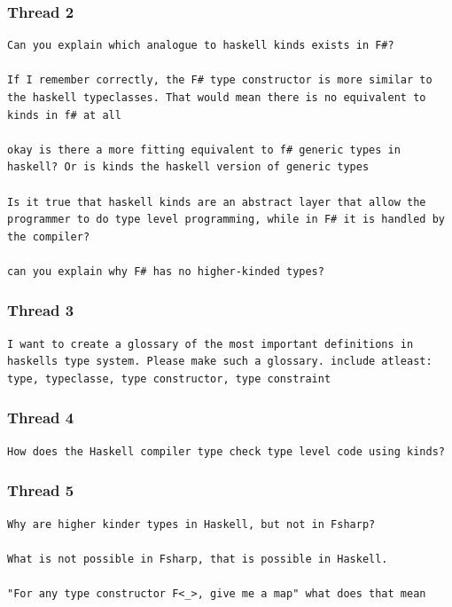 \documentclass[12pt,oneside,a4paper]{article}
\begin{document}
\subsubsection*{Thread 2}
\begin{lstlisting}
Can you explain which analogue to haskell kinds exists in F#?

If I remember correctly, the F# type constructor is more similar to the haskell typeclasses. That would mean there is no equivalent to kinds in f# at all

okay is there a more fitting equivalent to f# generic types in haskell? Or is kinds the haskell version of generic types

Is it true that haskell kinds are an abstract layer that allow the programmer to do type level programming, while in F# it is handled by the compiler?

can you explain why F# has no higher-kinded types?
\end{lstlisting}
\subsubsection*{Thread 3}
\begin{lstlisting}
I want to create a glossary of the most important definitions in haskells type system. Please make such a glossary. include atleast: type, typeclasse, type constructor, type constraint
\end{lstlisting}
\subsubsection*{Thread 4}
\begin{lstlisting}
How does the Haskell compiler type check type level code using kinds?
\end{lstlisting}
\subsubsection*{Thread 5}
\begin{lstlisting}
Why are higher kinder types in Haskell, but not in Fsharp?

What is not possible in Fsharp, that is possible in Haskell.

"For any type constructor F<_>, give me a map" what does that mean
\end{lstlisting}
\end{document}
